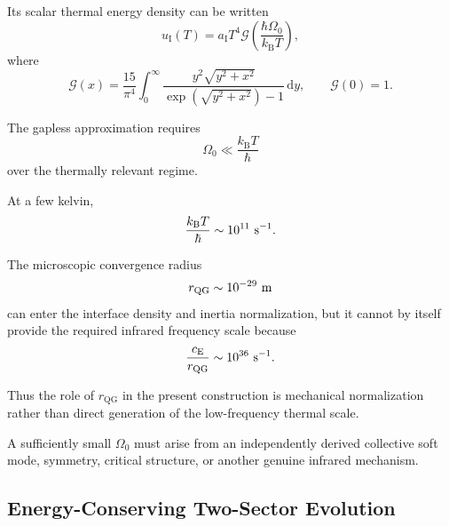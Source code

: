 Its scalar thermal energy density can be written
\begin{equation}
    u_{\mathrm I}(T)
    =
    a_{\mathrm I}T^4
    \mathcal G
    \left(
        \frac{
            \hbar\Omega_0
        }{
            k_{\mathrm B}T
        }
    \right),
    \label{eq:AT_interface_gapped_energy}
\end{equation}
where
\begin{equation}
    \mathcal G(x)
    =
    \frac{15}{\pi^4}
    \int_0^\infty
    \frac{
        y^2\sqrt{y^2+x^2}
    }{
        \exp
        \left(
            \sqrt{y^2+x^2}
        \right)-1
    }
    \,\mathrm dy,
    \qquad
    \mathcal G(0)=1.
    \label{eq:AT_interface_gap_function}
\end{equation}

The gapless approximation requires
\begin{equation}
    \Omega_0
    \ll
    \frac{k_{\mathrm B}T}{\hbar}
    \label{eq:AT_interface_gap_requirement}
\end{equation}
over the thermally relevant regime.

At a few kelvin,
\begin{equation}
    \frac{k_{\mathrm B}T}{\hbar}
    \sim
    10^{11}~{\rm s^{-1}}.
\end{equation}

The microscopic convergence radius
\begin{equation}
    r_{\mathrm{QG}}
    \sim
    10^{-29}~{\rm m}
\end{equation}
can enter the interface density and inertia normalization, but it cannot by
itself provide the required infrared frequency scale because
\begin{equation}
    \frac{c_{\mathrm E}}{r_{\mathrm{QG}}}
    \sim
    10^{36}~{\rm s^{-1}}.
    \label{eq:AT_rQG_frequency_scale}
\end{equation}

Thus the role of
\(r_{\mathrm{QG}}\)
in the present construction is mechanical normalization rather than direct
generation of the low-frequency thermal scale.

A sufficiently small
\(\Omega_0\)
must arise from an independently derived collective soft mode, symmetry,
critical structure, or another genuine infrared mechanism.


\subsection{Energy-Conserving Two-Sector Evolution}


